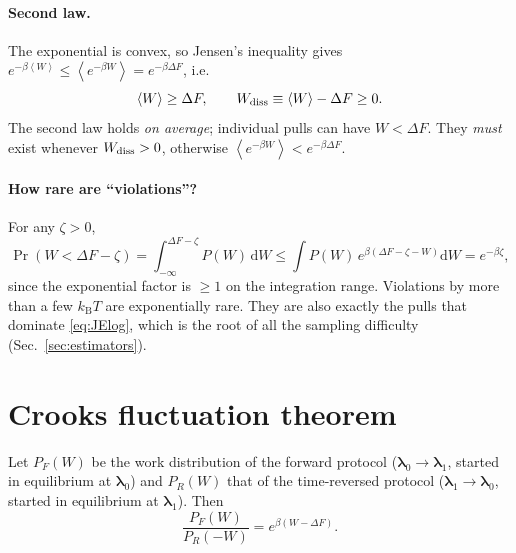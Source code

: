 \documentclass[11pt,a4paper]{article}
\newcommand{\kT}{k_{\mathrm B}T}
\newcommand{\dd}{\mathrm{d}}
\newcommand{\avg}[1]{\left\langle #1\right\rangle}
\newcommand{\lam}{\bm{\lambda}}
\newcommand{\Wd}{W_{\rm diss}}
\begin{document}
\paragraph{Second law.} The exponential is convex, so Jensen's inequality gives
$e^{-\beta\avg W}\le\avg{e^{-\beta W}}=e^{-\beta\Delta F}$, i.e.
\begin{equation}
\avg W\ge\Delta F,\qquad \Wd\equiv\avg W-\Delta F\ge0 .
\end{equation}
The second law holds \emph{on average}; individual pulls can have $W<\Delta F$. They \emph{must}
exist whenever $\Wd>0$, otherwise $\avg{e^{-\beta W}}<e^{-\beta\Delta F}$.

\paragraph{How rare are ``violations''?} For any $\zeta>0$,
\begin{equation}
\Pr(W<\Delta F-\zeta)=\int_{-\infty}^{\Delta F-\zeta}P(W)\,\dd W
\le\int P(W)\,e^{\beta(\Delta F-\zeta-W)}\dd W=e^{-\beta\zeta},
\end{equation}
since the exponential factor is $\ge1$ on the integration range. Violations by more than a few $\kT$
are exponentially rare. They are also exactly the pulls that dominate \eqref{eq:JElog}, which is the root of
all the sampling difficulty (Sec.~\ref{sec:estimators}).

\section{Crooks fluctuation theorem}
\label{sec:crooks}

\begin{note}
Let $P_F(W)$ be the work distribution of the forward protocol ($\lam_0\to\lam_1$, started in
equilibrium at $\lam_0$) and $P_R(W)$ that of the time-reversed protocol ($\lam_1\to\lam_0$, started in
equilibrium at $\lam_1$). Then
\begin{equation}
\frac{P_F(W)}{P_R(-W)}=e^{\beta(W-\Delta F)} .
\label{eq:crooks}
\end{equation}
\end{note}
\end{document}
